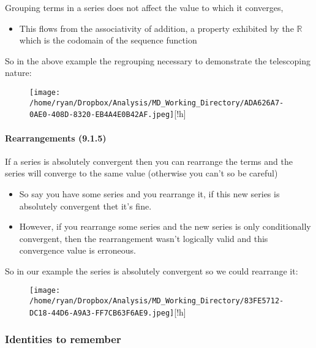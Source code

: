 \documentclass[
]{article}
\let\oldparagraph\paragraph
\renewcommand{\paragraph}[1]{\oldparagraph{#1}\mbox{}}
\begin{document}
Grouping terms in a series does not affect the value to which it
converges,

\begin{itemize}
\item
  This flows from the associativity of addition, a property exhibited by
  the \(\mathbb{R}\) which is the codomain of the sequence function
\end{itemize}

So in the above example the regrouping necessary to demonstrate the
telescoping nature:

\begin{figure}
\centering
\texttt{[image: /home/ryan/Dropbox/Analysis/MD\_Working\_Directory/ADA626A7-0AE0-408D-8320-EB4A4E0B42AF.jpeg]}[!h]
\caption{}
\end{figure}

\newpage
\hypertarget{header-n3232}{%
\paragraph{Rearrangements (9.1.5)}\label{header-n3232}}

If a series is absolutely convergent then you can rearrange the terms
and the series will converge to the same value (otherwise you can't so
be careful)

\begin{itemize}
\item
  So say you have some series and you rearrange it, if this new series
  is absolutely convergent thet it's fine.
\item
  However, if you rearrange some series and the new series is only
  conditionally convergent, then the rearrangement wasn't logically
  valid and this convergence value is erroneous. 
\end{itemize}

So in our example the series is absolutely convergent so we could
rearrange it:

\begin{figure}
\centering
\texttt{[image: /home/ryan/Dropbox/Analysis/MD\_Working\_Directory/83FE5712-DC18-44D6-A9A3-FF7CB63F6AE9.jpeg]}[!h]
\caption{}
\end{figure}

\newpage
\hypertarget{header-n3241}{%
\subsubsection{Identities to remember}\label{header-n3241}}
\end{document}

